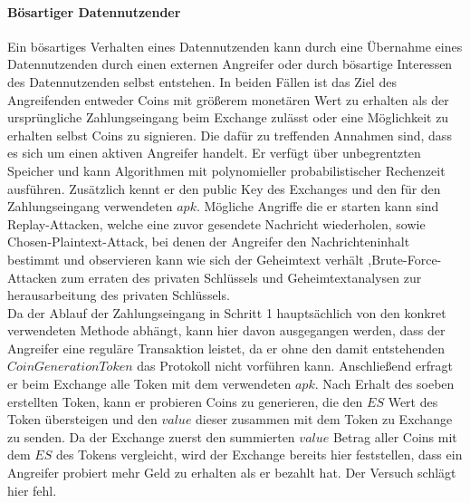 \documentclass[11pt,a4paper]{scrreprt}
\begin{document}
\paragraph{Bösartiger Datennutzender}
Ein bösartiges Verhalten eines Datennutzenden kann durch eine Übernahme eines Datennutzenden durch einen externen Angreifer oder durch bösartige Interessen des Datennutzenden selbst entstehen. In beiden Fällen ist das Ziel des Angreifenden entweder Coins mit größerem monetären Wert zu erhalten als der ursprüngliche Zahlungseingang beim Exchange zulässt oder eine Möglichkeit zu erhalten selbst Coins zu signieren. Die dafür zu treffenden Annahmen sind, dass es sich um einen aktiven Angreifer handelt. Er verfügt über unbegrentzten Speicher und kann Algorithmen mit polynomieller probabilistischer Rechenzeit ausführen. Zusätzlich kennt er den public Key des Exchanges und den für den Zahlungseingang verwendeten $apk$. Mögliche Angriffe die er starten kann sind Replay-Attacken, welche eine zuvor gesendete Nachricht wiederholen, sowie Chosen-Plaintext-Attack, bei denen der Angreifer den Nachrichteninhalt bestimmt und observieren kann wie sich der Geheimtext verhält ,Brute-Force-Attacken zum erraten des privaten Schlüssels und Geheimtextanalysen zur herausarbeitung des privaten Schlüssels.\\

Da der Ablauf der Zahlungseingang in Schritt 1 hauptsächlich von den konkret verwendeten Methode abhängt, kann hier davon ausgegangen werden, dass der Angreifer eine reguläre Transaktion leistet, da er ohne den damit entstehenden $CoinGenerationToken$ das Protokoll nicht vorführen kann. 
Anschließend erfragt er beim Exchange alle Token mit dem verwendeten $apk$. Nach Erhalt des soeben erstellten Token, kann er probieren Coins zu generieren, die den $ES$ Wert des Token übersteigen und den $value$ dieser zusammen mit dem Token zu Exchange zu senden. Da der Exchange zuerst den summierten $value$ Betrag aller Coins mit dem $ES$ des Tokens vergleicht, wird der Exchange bereits hier feststellen, dass ein Angreifer probiert mehr Geld zu erhalten als er bezahlt hat. Der Versuch schlägt hier fehl.\\
\end{document}
